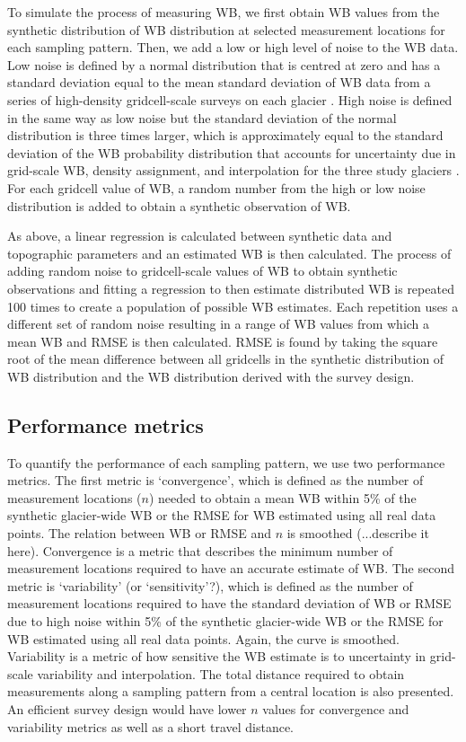 \documentclass{article}
\begin{document}
To simulate the process of measuring WB, we first obtain WB values from the synthetic distribution of WB distribution at selected measurement locations for each sampling pattern. Then, we add a low or high level of noise to the WB data. Low noise is defined by a normal distribution that is centred at zero and has a standard deviation equal to the mean standard deviation of WB data from a series of high-density gridcell-scale surveys on each glacier  \parencite{Pulwicki2017}. High noise is defined in the same way as low noise but the standard deviation of the normal distribution is three times larger, which is approximately equal to the standard deviation of the WB probability distribution that accounts for uncertainty due in grid-scale WB, density assignment, and interpolation for the three study glaciers  \parencite{Pulwicki2017}. For each gridcell value of WB, a random number from the high or low noise distribution is added to obtain a synthetic observation of WB.

As above, a linear regression is calculated between synthetic data and topographic parameters and an estimated WB is then calculated. The process of adding random noise to gridcell-scale values of WB to obtain synthetic observations and fitting a regression to then estimate distributed WB is repeated 100 times to create a population of possible WB estimates. Each repetition uses a different set of random noise resulting in a range of WB values from which a mean WB and RMSE is then calculated. RMSE is found by taking the square root of the mean difference between all gridcells in the synthetic distribution of WB distribution and the WB distribution derived with the survey design.
 
 \subsection{Performance metrics}
 
To quantify the performance of each sampling pattern, we use two performance metrics. The first metric is `convergence', which is defined as the number of measurement locations ($n$) needed to obtain a mean WB within 5\% of the synthetic glacier-wide WB or the RMSE for WB estimated using all real data points. The relation between WB or RMSE and $n$ is smoothed (...describe it here). Convergence is a metric that describes the minimum number of measurement locations required to have an accurate estimate of WB. The second metric is `variability' (or `sensitivity'?), which is defined as the number of measurement locations required to have the standard deviation of WB or RMSE due to high noise within 5\% of the synthetic glacier-wide WB or the RMSE for WB estimated using all real data points. Again, the curve is smoothed. Variability is a metric of how sensitive the WB estimate is to uncertainty in grid-scale variability and interpolation. The total distance required to obtain measurements along a sampling pattern from a central location is also presented. An efficient survey design would have lower $n$ values for convergence and variability metrics as well as a short travel distance. 
\end{document}
